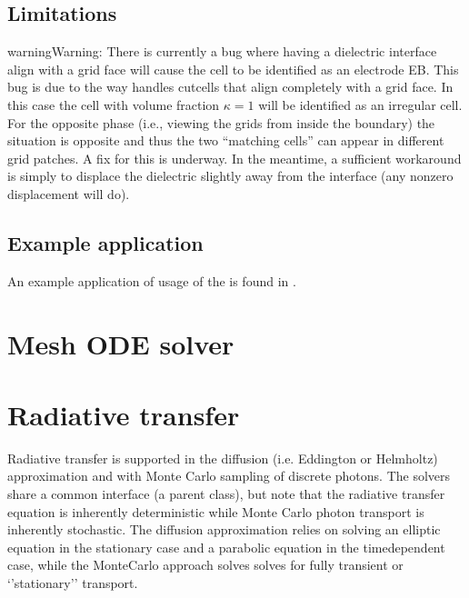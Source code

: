 \documentclass[letterpaper,10pt,english]{sphinxmanual}
\begin{document}
\subsection{Limitations}
\label{\detokenize{Solvers/Electrostatics:limitations}}
\begin{sphinxadmonition}{warning}{Warning:}
There is currently a bug where having a dielectric interface align  with a grid face will cause the cell to be identified as an electrode EB.
This bug is due to the way  handles cut\sphinxhyphen{}cells that align completely with a grid face.
In this case the cell with volume fraction \(\kappa = 1\) will be identified as an irregular cell.
For the opposite phase (i.e., viewing the grids from inside the boundary) the situation is opposite and thus the two “matching cells” can appear in different grid patches.
A fix for this is underway.
In the meantime, a sufficient workaround is simply to displace the dielectric slightly away from the interface (any non\sphinxhyphen{}zero displacement will do).
\end{sphinxadmonition}


\subsection{Example application}
\label{\detokenize{Solvers/Electrostatics:example-application}}
An example application of usage of the  is found in {\hyperref[\detokenize{Applications/ElectrostaticsModel:chap-electrostaticsmodel}]{}}.


\section{Mesh ODE solver}
\label{\detokenize{Solvers/MeshODESolver:mesh-ode-solver}}\label{\detokenize{Solvers/MeshODESolver:chap-meshodesolver}}\label{\detokenize{Solvers/MeshODESolver::doc}}

\section{Radiative transfer}
\label{\detokenize{Solvers/RTE:radiative-transfer}}\label{\detokenize{Solvers/RTE:chap-radiativetransfer}}\label{\detokenize{Solvers/RTE::doc}}
Radiative transfer is supported in the diffusion (i.e. Eddington or Helmholtz) approximation and with Monte Carlo sampling of discrete photons.
The solvers share a common interface (a parent class), but note that the radiative transfer equation is inherently deterministic while Monte Carlo photon transport is inherently stochastic.
The diffusion approximation relies on solving an elliptic equation in the stationary case and a parabolic equation in the time\sphinxhyphen{}dependent case, while the Monte\sphinxhyphen{}Carlo approach solves solves for fully transient or ‘’stationary’’ transport.
\end{document}
